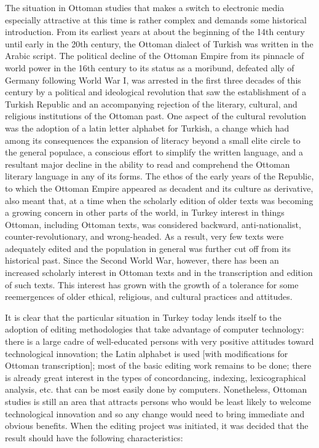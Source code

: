         The situation in Ottoman studies that makes a
switch to electronic media especially attractive at this
time is rather complex and demands some historical
introduction.  From its earliest years at about the
beginning of the 14th century until early in the 20th
century, the Ottoman dialect of Turkish was written in
the Arabic script.  The political decline of the Ottoman
Empire from its pinnacle of world power in the 16th
century to its status as a moribund, defeated ally of
Germany following World War I, was arrested in the first
three decades of this century by a political and
ideological revolution that saw the establishment of a
Turkish Republic and an accompanying rejection of the
literary, cultural, and religious institutions of the
Ottoman past.  One aspect of the cultural revolution was
the adoption of a latin letter alphabet for Turkish, a
change which had among its
consequences the expansion of literacy beyond a small
elite circle to the general populace, a conscious effort
to simplify the written language, and a resultant major
decline in the ability to read and comprehend the Ottoman
literary language in any of its forms.  The ethos of the
early years of the Republic, to which the Ottoman Empire
appeared as decadent and its culture as derivative, also
meant that, at a time when the scholarly edition of older
texts was becoming a growing concern in other parts of
the world, in Turkey interest in things Ottoman,
including Ottoman texts, was considered backward,
anti-nationalist, counter-revolutionary, and
wrong-headed.  As a result, very few texts were
adequately edited and the population in general was
further cut off from its historical past.  Since the
Second World War, however, there has been an increased
scholarly interest in Ottoman texts and in the
transcription and edition of such texts.  This interest
has grown with the growth of a tolerance for some
reemergences of older ethical, religious, and cultural
practices and attitudes.

        It is clear that the particular situation in
Turkey today lends itself to the adoption of editing
methodologies that take advantage of computer technology:
there is a large cadre of well-educated persons with very
positive attitudes toward technological innovation; the
Latin alphabet is used [with modifications for Ottoman
transcription]; most of the basic editing work remains to
be done; there is already great interest in the types of
concordancing, indexing, lexicographical analysis, etc.
that can be most easily done by computers.  Nonetheless,
Ottoman studies is still an area that attracts persons
who would be least likely to welcome technological
innovation and so any change would need to bring
immediate and obvious benefits.  When the editing project
was initiated, it was decided that the result should have
the following characteristics:


